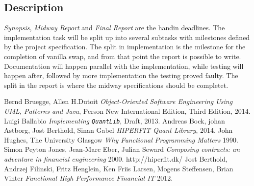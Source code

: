 \documentclass{article}
\newcommand{\QL}{\texttt{QuantLib}}
\begin{document}
\subsection{Description}
\emph{Synopsis}, \emph{Midway Report} and \emph{Final Report} are the handin deadlines.
The implementation task will be split up into several subtasks with milestones defined by the project specification. The split in
implementation is the milestone for the completion of vanilla swap, and from that point the report is possible to write.
Documentation will happen parallel with the implementation, while testing will happen after, followed by more implementation the testing
proved faulty. The split in the report is where the midway specifications should be completet.
\begin{thebibliography}{9}
    Bernd Bruegge, Allen H.Dutoit
    \emph{Object-Oriented Software Engineering Using UML, Patterns and Java},
    Person New International Edition,
    Third Edition,
    2014.
    Luigi Ballabio
    \emph{Implementing \QL},
    Draft,
    2013.
    Andreas Bock, johan Astborg, Jost Berthold, Sinan Gabel
    \emph{HIPERFIT Quant Library},
    2014.
    John Hughes, The University Glasgow
    \emph{Why Functional Programming Matters} 
    1990.
    Simon Peyton Jones, Jean-Marc Eber, Julian Seward
    \emph{Composing contracts: an adventure in financial engineering}
    2000.
    http://hiperfit.dk/
    Jost Berthold, Andrzej Filinski, Fritz Henglein, Ken Friis Larsen, Mogens Steffensen, Brian Vinter
    \emph{Functional High Performance Financial IT}
    2012.
\end{thebibliography}
\end{document}
